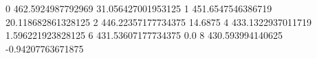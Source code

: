0 462.5924987792969 31.056427001953125
1 451.6547546386719 20.118682861328125
2 446.22357177734375 14.6875
4 433.1322937011719 1.596221923828125
6 431.53607177734375 0.0
8 430.593994140625 -0.94207763671875
